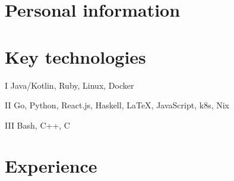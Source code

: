 \documentclass{cv}
\begin{document}

\section{Personal information}






\section{Key technologies}

\begin{cvblock}{I}
  Java/Kotlin, Ruby, Linux, Docker
\end{cvblock}

\begin{cvblock}{II}
  Go, Python, React.js, Haskell, \LaTeX, JavaScript, k8s, Nix
\end{cvblock}

\begin{cvblock}{III}
  Bash, C++, C
\end{cvblock}


\section{Experience}
\end{document}
